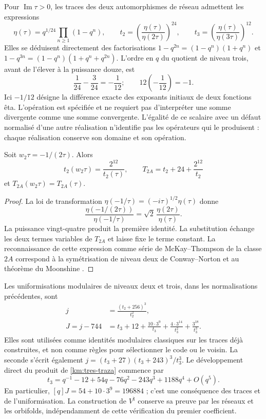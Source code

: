 Pour \(\operatorname{Im}\tau>0\), les traces des deux automorphismes de réseau admettent les expressions
\begin{equation}
 \eta(\tau)=q^{1/24}\prod_{n\ge1}(1-q^n),\qquad
 t_2=\left(\frac{\eta(\tau)}{\eta(2\tau)}\right)^{24},\qquad
 t_3=\left(\frac{\eta(\tau)}{\eta(3\tau)}\right)^{12}.
 \label{km:eta-trazas}
\end{equation}
Elles se déduisent directement des factorisations
\(1-q^{2n}=(1-q^n)(1+q^n)\) et
\(1-q^{3n}=(1-q^n)(1+q^n+q^{2n})\). L'ordre en \(q\) du
quotient de niveau trois, avant de l'élever à la puissance douze, est
\[
 \frac1{24}-\frac3{24}=-\frac1{12};
 \qquad 12\left(-\frac1{12}\right)=-1.
\]
Ici \(-1/12\) désigne la différence exacte des exposants
initiaux de deux fonctions êta. L’opération est spécifiée et ne
requiert pas d’interpréter une somme divergente comme une somme convergente.
L’égalité de ce scalaire avec un défaut normalisé d’une autre
réalisation n’identifie pas les opérateurs qui le produisent : chaque
réalisation conserve son domaine et son opération.

\begin{proposition}
\label{km:fricke-prop}
Soit \(w_2\tau=-1/(2\tau)\). Alors
\begin{equation}
 t_2(w_2\tau)=\frac{2^{12}}{t_2(\tau)},\qquad
 T_{2A}=t_2+24+\frac{2^{12}}{t_2}
 \label{km:fricke-t2}
\end{equation}
et \(T_{2A}(w_2\tau)=T_{2A}(\tau)\).
\end{proposition}
\begin{proof}
La loi de transformation
\(\eta(-1/\tau)=(-i\tau)^{1/2}\eta(\tau)\) donne
\[
 \frac{\eta(-1/(2\tau))}{\eta(-1/\tau)}
 =\sqrt2\,\frac{\eta(2\tau)}{\eta(\tau)}.
\]
La puissance vingt-quatre produit la première identité. La substitution
échange les deux termes variables de \(T_{2A}\) et laisse fixe
le terme constant. La reconnaissance de cette expression comme série
de McKay--Thompson de la classe \(2A\) correspond à la
symétrisation de niveau deux de Conway--Norton
\cite[\S\S4 y 6, tabla~3]{kmconwaynorton1979} et au théorème
du Moonshine \cite{borcherds}.
\end{proof}

Les uniformisations modulaires de niveaux deux et trois, dans les
normalisations précédentes, sont
\begin{align}
 j&=\frac{(t_2+256)^3}{t_2^2},
 \label{km:j-nivel2}\\
 J=j-744
 &=t_3+12+\frac{10\cdot3^9}{t_3}
       +\frac{4\cdot3^{14}}{t_3^2}
       +\frac{3^{18}}{t_3^3}.
 \label{km:j-nivel3}
\end{align}
Elles sont utilisées comme identités modulaires classiques sur les traces déjà
construites, et non comme règles pour sélectionner le code ou le voisin.
La seconde s'écrit également
\(j=(t_3+27)(t_3+243)^3/t_3^3\).
Le développement direct du produit de \eqref{km:tres-traza} commence par
\[
 t_3=q^{-1}-12+54q-76q^2-243q^3+1188q^4+O(q^5).
\]
En particulier, \([q]J=54+10\cdot3^9=196884\) ; c'est une conséquence des traces et de l'uniformisation. La construction de \(V^\natural\) conserve sa preuve par les réseaux et les orbifolds, indépendamment de cette vérification du premier coefficient.

